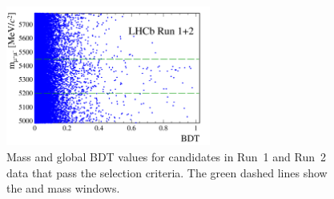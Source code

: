 \begin{figure}[tbp]
    \centering
    \includegraphics[width=0.6\textwidth]{./Figs/Selection/hidef_Fig3.png}
    \caption{Mass and global BDT values for candidates in Run~1 and Run~2 data that pass the \bmumu selection criteria. The green dashed lines show the \bs and \bd mass windows.}


\end{figure}
